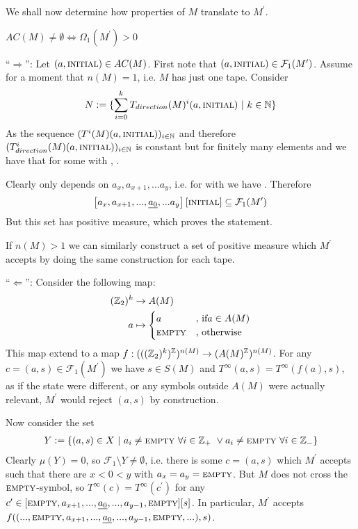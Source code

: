 We shall now determine how properties of $M$ translate to $M^\prime$.

\begin{Lemma}
	\label{tm_to_tds:properties:lemma_fundamental_value}
	$AC(M) \neq \emptyset \Leftrightarrow \Omega_1(M^\prime) > 0$
\end{Lemma}
\proof
	``$\Rightarrow$'':
	Let $(a,\text{\scshape{initial}}) \in AC(M)$.
	First note that $(a,\text{\scshape{initial}}) \in \mathcal{F}_1(M^\prime)$.
	Assume for a moment that $n(M) = 1$, i.e. $M$ has just one tape. Consider
	\begin{align*}
		N := \{ \sum_{i=0}^k T_{direction}(M)^i(a,\text{\scshape{initial}})~|~k \in \mathbb{N} \}
	\end{align*}
	As the sequence $(T^i(M)(a,\text{\scshape{initial}}))_{i \in \mathbb{N}}$ and therefore $(T_{direction}^i(M)(a,\text{\scshape{initial}}))_{i \in \mathbb{N}}$ is constant but for finitely many elements
	and 
	we have that  for some  with , .
	
	Clearly  only depends on $a_x, a_{x+1},...a_y$, i.e. for  with  we have . Therefore
	\begin{align*}
		\left [ a_x, a_{x+1},...,\underline{a_0},...a_y \right ] \left [\text{\scshape{initial}} \right ] \subseteq \mathcal{F}_1(M^\prime)
	\end{align*}
	But this set has positive measure, which proves the statement.

	If $n(M) > 1$ we can similarly construct a set of positive measure which $M^\prime$ accepts by doing the same construction for each tape.

	``$\Leftarrow$'':
		Consider the following map:
		\begin{align*}
			(\mathbb{Z}_2)^k &\to A(M) \\
			a &\mapsto
			\begin{cases}
				a &\text{, if} a \in A(M) \\
				\text{\scshape{empty}} &\text{, otherwise}
			\end{cases}
		\end{align*}
		This map extend to a map $f: (((\mathbb{Z}_2)^k)^{\mathbb{Z}})^{n(M)} \to (A(M)^{\mathbb{Z}})^{n(M)}$.
		For any $c = (a,s) \in \mathcal{F}_1(M^\prime)$ we have $s \in S(M)$ and $T^\infty(a,s) = T^\infty(f(a),s)$, as if the state were different, or any symbols outside $A(M)$ were actually relevant, $M^\prime$ would reject $(a,s)$ by construction.

		Now consider the set
		\begin{align*}
			Y := \{ (a,s) \in X ~|~ a_i \neq \text{\scshape{empty}} ~\forall i \in \mathbb{Z}_+ ~\vee a_i \neq \text{\scshape{empty}} ~\forall i \in \mathbb{Z}_{-} \}
		\end{align*}
		Clearly $\mu(Y) = 0$, so $\mathcal{F}_1 \setminus Y \neq \emptyset$, i.e. there is some $c = (a,s)$ which $M^\prime$ accepts such that there are $x < 0 < y$ with $a_x = a_y = \text{\scshape{empty}}$.
		But $M$ does not cross the $\text{\scshape{empty}}$-symbol, so $T^\infty(c) = T^\infty(c^\prime)$ for any $c^\prime \in \lbrack \text{\scshape{empty}}, a_{x+1}, ... , \underline{a_0}, ... , a_{y-1}, \text{\scshape{empty}} \rbrack \lbrack s \rbrack$.
		In particular, $M^\prime$ accepts $f((...,\text{\scshape{empty}},a_{x+1},...,\underline{a_0},...,a_{y-1},\text{\scshape{empty}},...),s)$.
		
